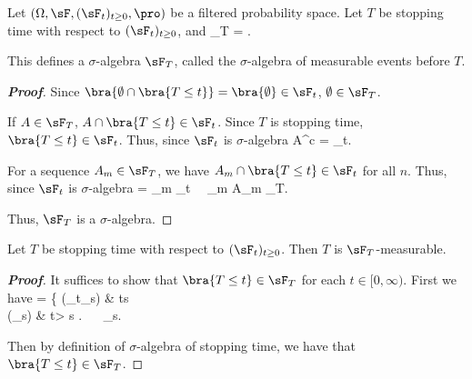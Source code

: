 
\begin{definition}\label{def:sigma_algebra_stopping_time_continuous}
Let $(\Omega,\sF, (\sF_t)_{t\geq 0},\pro)$ be a filtered probability space. Let $T$ be stopping time with respect to $(\sF_t)_{t\geq 0}$, and
\be
\sF_T = \bra{A \in\sF : A\cap \{T \leq t\} \in \sF_t,\ \forall t\in [0,\infty)}.
\ee

This defines a $\sigma$-algebra $\sF_T$, called the $\sigma$-algebra of measurable events before $T$.
\end{definition}

\begin{proof}[\bf Proof]
\ben
\item [(i)] Since $\bra{\emptyset \cap \bra{T\leq t}} = \bra{\emptyset} \in \sF_t$, $\emptyset \in \sF_T$.
\item [(ii)] If $A\in \sF_T$, $A \cap \bra{T\leq t} \in \sF_t$. Since $T$ is stopping time, $\bra{T\leq t}\in \sF_t$. Thus, since $\sF_t$ is $\sigma$-algebra
\be
A^c \cap {} =  \bs {} \in \sF_t.
\ee
\item [(iii)] For a sequence $A_m \in \sF_T$, we have $A_m \cap \bra{T\leq t}\in \sF_t$ for all $n$. Thus, since $\sF_t$ is $\sigma$-algebra
\be
{} \cap {} = \bigcup_m  \in \sF_t  \ \ra \ \bigcup_m A_m \in \sF_T.
\ee
\een

Thus, $\sF_T$ is a $\sigma$-algebra.
\end{proof}

\begin{proposition}
Let $T$ be stopping time with respect to $(\sF_t)_{t\geq 0}$. Then $T$ is $\sF_T$-measurable.
\end{proposition}

\begin{proof}[\bf Proof]
It suffices to show that $\bra{T\leq t}\in \sF_T$ for each $t\in [0,\infty)$. First we have
\be
{}\cap {} = \left\{
 (\in \sF_t\subseteq \sF_s) \quad\quad & t\leq s \\
(\in \sF_s) & t> s
\ea
\right. \ \ra\ \cap {} \in \sF_s.
\ee

Then by definition of $\sigma$-algebra of stopping time, we have that $\bra{T\leq t}\in \sF_T$.
\end{proof}

